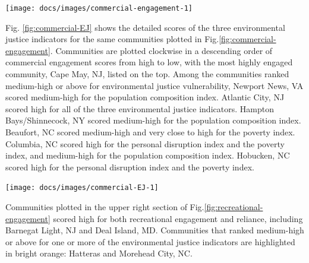 \documentclass[
  10pt,
]{article}
\let\origfigure\figure
\let\endorigfigure\endfigure
\renewenvironment{figure}[1][2] {
    \expandafter\origfigure\expandafter[H]
} {
    \endorigfigure
}
\begin{document}
\begin{figure}

{\centering \texttt{[image: docs/images/commercial-engagement-1]} 

}

\caption{Commercial engagement, reliance, and environmental justice vulnerability for the top commercially engaged and reliant fishing communities in the Mid-Atlantic.  Communities ranked medium-high or above for one or more of the environmental justice indicators are highlighted in bright orange. *Community scored high (1.00 and above) for both commercial engagement and reliance indicators.}\label{fig:commercial-engagement}
\end{figure}

Fig. \ref{fig:commercial-EJ} shows the detailed scores of the three
environmental justice indicators for the same communities plotted in
Fig.\ref{fig:commercial-engagement}. Communities are plotted clockwise
in a descending order of commercial engagement scores from high to low,
with the most highly engaged community, Cape May, NJ, listed on the top.
Among the communities ranked medium-high or above for environmental
justice vulnerability, Newport News, VA scored medium-high for the
population composition index. Atlantic City, NJ scored high for all of
the three environmental justice indicators. Hampton Bays/Shinnecock, NY
scored medium-high for the population composition index. Beaufort, NC
scored medium-high and very close to high for the poverty index.
Columbia, NC scored high for the personal disruption index and the
poverty index, and medium-high for the population composition index.
Hobucken, NC scored high for the personal disruption index and the
poverty index.

\begin{figure}

{\centering \texttt{[image: docs/images/commercial-EJ-1]} 

}

\caption{Environmental justice indicators (Poverty Index, population composition index, and personal disruption index) for top commercial fishing communities in Mid-Atlantic. *Community scored high (1.00 and above) for both commercial engagement and reliance indicators.}\label{fig:commercial-EJ}
\end{figure}

Communities plotted in the upper right section of
Fig.\ref{fig:recreational-engagement} scored high for both recreational
engagement and reliance, including Barnegat Light, NJ and Deal Island,
MD. Communities that ranked medium-high or above for one or more of the
environmental justice indicators are highlighted in bright orange:
Hatteras and Morehead City, NC.
\end{document}
